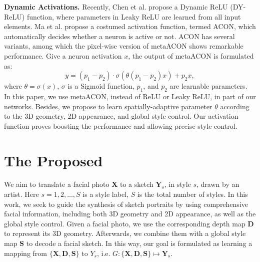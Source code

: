 \documentclass[10pt,twocolumn,letterpaper]{article}
\begin{document}
\textbf{Dynamic Activations.}
Recently, Chen et al. \cite{dyrelu} propose a Dynamic ReLU (DY-ReLU) function, where parameters in Leaky ReLU are learned from all input elements. Ma et al. \cite{ma2021acon} propose a costumed activation function, termed ACON, which automatically decides whether a neuron is active or not. ACON has several variants, among which the pixel-wise version of metaACON shows remarkable performance. Give a neuron activation $x$, the output of metaACON is formulated as:
\begin{equation}
	y = (p_1 - p_2) \cdot \sigma(\theta(p_1 - p_2)x) + p_2x,
	\label{eq:acon} 
\end{equation}
where $\theta = \sigma(x)$, $\sigma$ is a Sigmoid function, $p_1$, and $p_2$ are learnable parameters.  
In this paper, we use metaACON, instead of ReLU or Leaky ReLU, in part of our networks. Besides, we propose to learn spatially-adaptive parameter $\theta$ according to the 3D geometry, 2D appearance, and global style control. Our activation function proves boosting the performance and allowing precise style control. 


\section{The Proposed}
\label{sec:method}


We aim to translate a facial photo $\mathbf{X}$ to a sketch $\mathbf{Y}_s$, in style $s$, drawn by an artist. Here $s=1,2,...,S$ is a style label, $S$ is the total number of styles. %
In this work, we seek to guide the synthesis of sketch portraits by using comprehensive facial information, including both 3D geometry and 2D appearance, as well as the global style control. 
Given a facial photo, we use the corresponding depth map $\mathbf{D}$ to represent its 3D geometry. Afterwards, we combine them with a global style map $\mathbf{S}$ to decode a facial sketch. In this way, our goal is formulated as learning a mapping from $\{\mathbf{X}, \mathbf{D}, \mathbf{S}\}$ to $Y_s$, i.e. $G: \{\mathbf{X}, \mathbf{D}, \mathbf{S}\} \mapsto \mathbf{Y}_s$. 
\end{document}
